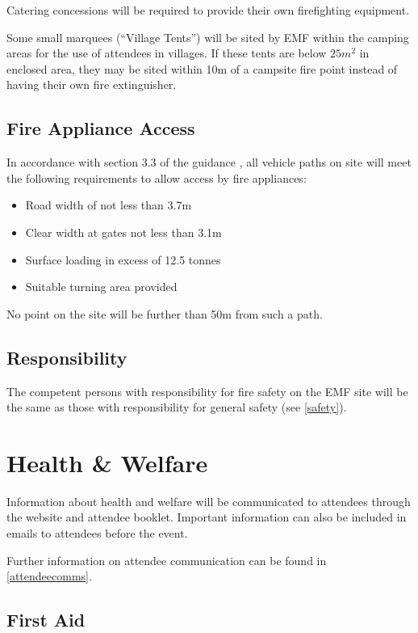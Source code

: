Catering concessions will be required to provide their own firefighting equipment.

Some small marquees (``Village Tents'') will be sited by EMF within the camping areas for the use of
attendees in villages. If these tents are below $25m^2$ in enclosed area, they may be sited within 10m
of a campsite fire point instead of having their own fire extinguisher.

\subsection{Fire Appliance Access}
In accordance with section 3.3 of the guidance \cite{firesafety}, all vehicle paths on site
will meet the following requirements to allow access by fire appliances:

\begin{itemize}
    \tightlist
    \item Road width of not less than 3.7m
    \item Clear width at gates not less than 3.1m
    \item Surface loading in excess of 12.5 tonnes
    \item Suitable turning area provided
\end{itemize}

No point on the site will be further than 50m from such a path.

\subsection{Responsibility}
The competent persons with responsibility for fire safety on the EMF site will be the same
as those with responsibility for general safety (see \cref{safety}).

\newpage
\section{Health \& Welfare}
\label{healthwelfare}

Information about health and welfare will be communicated to attendees through the website
and attendee booklet. Important information can also be included in emails to attendees
before the event.

Further information on attendee communication can be found in \cref{attendeecomms}.

\subsection{First Aid}

